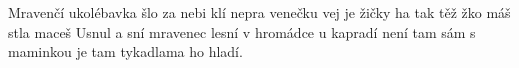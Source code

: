 \begin{TEXT}{Mravenčí ukolébavka}
\SLOKA {} šlo  za   \NL
{} nebi  klí \NL
{} nepra venečku  \NL
{}vej   je 
\REFREN  {} žičky ha   tak těž \NL
{} žko máš stla   maceš 
\SLOKA Usnul a sní mravenec lesní v hromádce u kapradí \NL
není tam sám s maminkou je tam \NL
tykadlama ho hladí. 
\end{TEXT}
